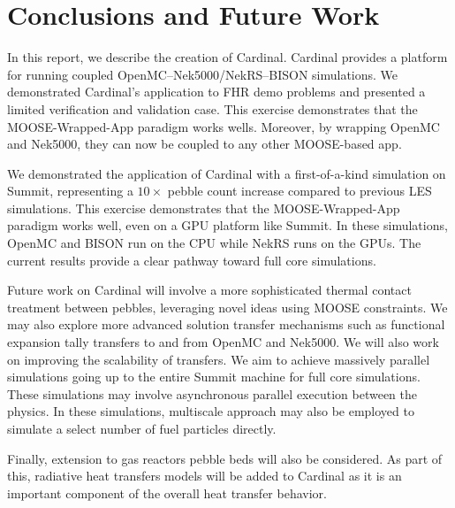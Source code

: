 
\section{Conclusions and Future Work}
\label{s:sum}


In this report, we describe the creation of Cardinal. Cardinal provides a platform for running coupled
OpenMC--Nek5000/NekRS--BISON simulations. We demonstrated Cardinal's application to FHR demo problems and
presented a limited verification and validation case. This exercise demonstrates that the MOOSE-Wrapped-App
paradigm works wells. Moreover, by wrapping OpenMC and Nek5000, they can now be coupled to any other MOOSE-based app.

We demonstrated the application of Cardinal with a first-of-a-kind simulation on Summit, representing a $10\times$ pebble count increase compared to previous LES simulations. This exercise demonstrates that the MOOSE-Wrapped-App paradigm works well, even on a GPU platform like Summit. In these simulations, OpenMC and BISON run on the CPU while NekRS runs on the GPUs. The current results provide a clear pathway toward full core simulations.

Future work on Cardinal will involve a more sophisticated thermal contact treatment between pebbles,
leveraging novel ideas using MOOSE constraints. We may also explore more advanced solution transfer
mechanisms such as functional expansion tally transfers to and from OpenMC and Nek5000. We
will also work on improving the scalability of transfers. We aim to achieve massively parallel simulations going up to the entire Summit machine for full core simulations. These simulations may involve asynchronous parallel execution between the
physics. In these simulations, multiscale approach may also be employed to simulate a select number of fuel particles directly.

Finally, extension to gas reactors pebble beds will also be considered. As part of this, radiative heat transfers models will be added to Cardinal as it is an important component of the overall heat transfer behavior.
